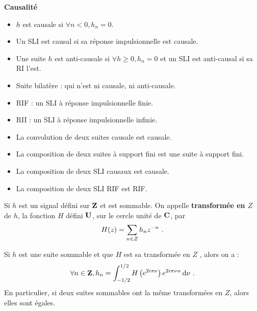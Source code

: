\begin{voc}
	\textbf{Causalité}
	\begin{itemize}
	\item $h$ est causale si $\forall n<0, h_{n}=0$.
	\item Un SLI est causal si sa réponse impulsionnelle est causale.
	\item Une suite $h$ est anti-causale si $\forall h \geq 0, h_n = 0$ et un SLI est anti-causal si sa RI l'est.
	\item Suite bilatère : qui n'est ni causale, ni anti-causale.
	\item RIF : un SLI à réponse impulsionnelle finie.
	\item RII : un SLI à réponse impulsionnelle infinie.
	\end{itemize}
\end{voc}

\begin{pop}
	\begin{itemize}
	\item La convolution de deux suites causale est causale.
	\item La composition de deux suites à support fini est une suite à support fini.
	\item La composition de deux SLI causaux est causale.
	\item La composition de deux SLI RIF est RIF.
	\end{itemize}
\end{pop}

\begin{defn}
	Si $h$ est un signal défini sur $\mathbf{Z}$ et est sommable. On appelle \textbf{transformée en $Z$} de $h$, la fonction $H$ défini $\mathbf{U}$, sur le cercle unité de $\mathbf{C}$, par
	\vspace{-0.15cm}$$
	H(z) = \sum_{n\in Z} h_{n}z^{-n}\ .
	\vspace{-0.15cm}$$
\end{defn}

\begin{pop}
	Si $h$ est une suite sommable et que $H$ est sa transformée en $Z$ , alors on a :
	\vspace{-0.15cm}$$
	\forall n \in \Z, h_{n}= \int_{-1/2}^{1/2} H \left( e^{2i\pi \nu} \right) e^{2i\pi \nu n} \diff \nu\ .
	\vspace{-0.15cm}$$
	En particulier, si deux suites sommables ont la même transformées en $Z$, alors elles sont égales.
\end{pop}

